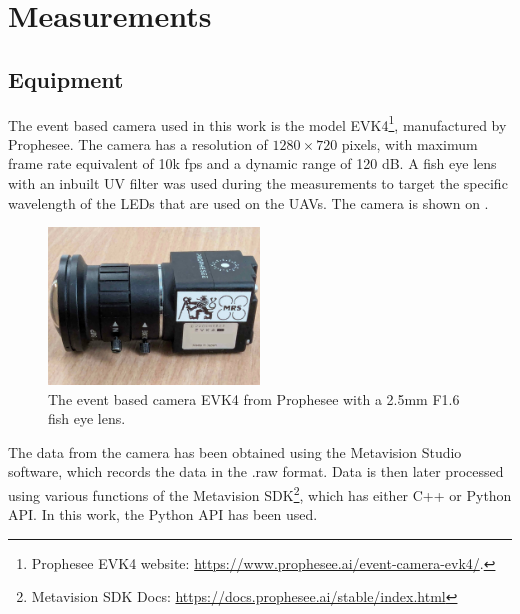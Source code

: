 
\chapter{Measurements\label{chap:measurements}}

\section{Equipment}

The event based camera used in this work is the model EVK4\footnote{Prophesee EVK4 website: \url{https://www.prophesee.ai/event-camera-evk4/}.}, manufactured by Prophesee. The camera has a resolution of 
$1280 \times 720$ pixels, with maximum frame rate equivalent of 10k fps and a dynamic range of 120 dB.
A fish eye lens with an inbuilt UV filter was used during the measurements to target the specific wavelength of the LEDs
that are used on the UAVs. The camera is shown on . 


\begin{figure}[htbp]
	\centering
	\includegraphics[width=0.50\textwidth]{./fig/photos/camera_with_lens.jpg}
	\caption{The event based camera EVK4 from Prophesee with a 2.5mm F1.6 fish eye lens.}
	\label{fig:evk4}
\end{figure}

The data from the camera has been obtained using the Metavision Studio software, which records the data in the .raw format.
Data is then later processed using various functions of the Metavision SDK\footnote{Metavision SDK Docs: \url{https://docs.prophesee.ai/stable/index.html}},
which has either C++ or Python API. In this work, the Python API has been used.

